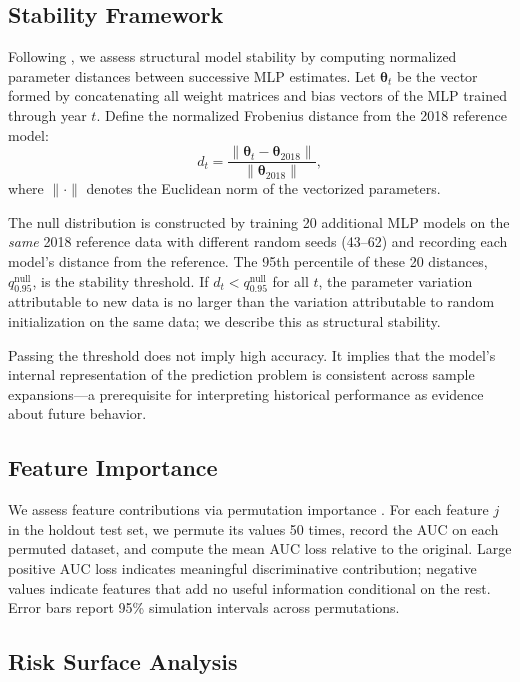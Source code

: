\documentclass[12pt]{article}
\begin{document}
\subsection{Stability Framework}\label{subsec:stability}

Following \citet{stability2024framework}, we assess structural model
stability by computing normalized parameter distances between successive
MLP estimates.  Let $\bm{\theta}_t$ be the vector formed by concatenating
all weight matrices and bias vectors of the MLP trained through year $t$.
Define the normalized Frobenius distance from the 2018 reference model:
\begin{equation}
d_t = \frac{\|\bm{\theta}_t - \bm{\theta}_{2018}\|}{\|\bm{\theta}_{2018}\|},
\label{eq:distance}
\end{equation}
where $\|\cdot\|$ denotes the Euclidean norm of the vectorized parameters.

The null distribution is constructed by training 20 additional MLP models
on the \emph{same} 2018 reference data with different random seeds (43--62)
and recording each model's distance from the reference.  The 95th percentile
of these 20 distances, $q_{0.95}^{\text{null}}$, is the stability threshold.
If $d_t < q_{0.95}^{\text{null}}$ for all $t$, the parameter variation
attributable to new data is no larger than the variation attributable to
random initialization on the same data; we describe this as structural
stability.

Passing the threshold does not imply high accuracy.  It implies that
the model's internal representation of the prediction problem is
consistent across sample expansions---a prerequisite for interpreting
historical performance as evidence about future behavior.

\subsection{Feature Importance}

We assess feature contributions via permutation importance
\citep{breiman2001random}.  For each feature $j$ in the holdout test set,
we permute its values 50 times, record the AUC on each permuted dataset,
and compute the mean AUC loss relative to the original.  Large positive
AUC loss indicates meaningful discriminative contribution; negative values
indicate features that add no useful information conditional on the rest.
Error bars report 95\% simulation intervals across permutations.

\subsection{Risk Surface Analysis}
\end{document}
